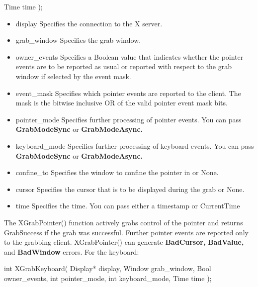 \documentclass{report}
\begin{document}
\begin{itemize}
\begin{cppcode}
                Time time
            );
            \end{cppcode}
            \bigbreak \noindent
            \begin{itemize}
                \item display	Specifies the connection to the X server.
                \item grab\_window	Specifies the grab window.
                \item owner\_events	Specifies a Boolean value that indicates whether the pointer events are to be reported as usual or reported with respect to the grab window if selected by the event mask.
                \item event\_mask	Specifies which pointer events are reported to the client. The mask is the bitwise inclusive OR of the valid pointer event mask bits.
                \item pointer\_mode	Specifies further processing of pointer events. You can pass \textbf{GrabModeSync} or \textbf{GrabModeAsync.}
                \item keyboard\_mode	Specifies further processing of keyboard events. You can pass \textbf{GrabModeSync} or \textbf{GrabModeAsync.}
                \item confine\_to	Specifies the window to confine the pointer in or None.
                \item cursor	Specifies the cursor that is to be displayed during the grab or None.
                \item time	Specifies the time. You can pass either a timestamp or CurrentTime
            \end{itemize}
            \bigbreak \noindent 
            The XGrabPointer() function actively grabs control of the pointer and returns GrabSuccess if the grab was successful. Further pointer events are reported only to the grabbing client. XGrabPointer() can generate \textbf{BadCursor,} \textbf{BadValue,} and \textbf{BadWindow} errors.
            \bigbreak \noindent 
            For the keyboard:
            \bigbreak \noindent 
            \begin{cppcode}
                int XGrabKeyboard(
                    Display* display,
                    Window grab_window,
                    Bool owner_events,
                    int pointer_mode,
                    int keyboard_mode,
                    Time time
                );
            \end{cppcode}
            \bigbreak \noindent
            \begin{itemize}

\end{itemize}
\end{itemize}
\end{document}
